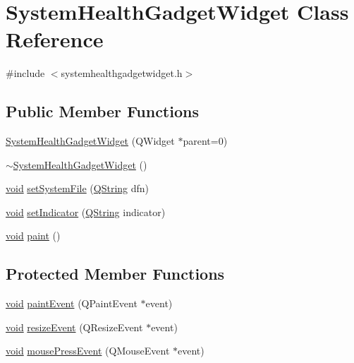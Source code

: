 \hypertarget{class_system_health_gadget_widget}{\section{\-System\-Health\-Gadget\-Widget \-Class \-Reference}
\label{class_system_health_gadget_widget}
}


{\ttfamily \#include $<$systemhealthgadgetwidget.\-h$>$}

\subsection*{\-Public \-Member \-Functions}
\begin{DoxyCompactItemize}
\item 
\hyperlink{group___system_health_plugin_ga8c9b20860af6995ec8b6970079e00477}{\-System\-Health\-Gadget\-Widget} (\-Q\-Widget $\ast$parent=0)
\item 
\hyperlink{group___system_health_plugin_gaafd1c69ed4569708eef2b628c1125ea8}{$\sim$\-System\-Health\-Gadget\-Widget} ()
\item 
\hyperlink{group___u_a_v_objects_plugin_ga444cf2ff3f0ecbe028adce838d373f5c}{void} \hyperlink{group___system_health_plugin_ga1caae283affc79dc1e9e0303d39d4158}{set\-System\-File} (\hyperlink{group___u_a_v_objects_plugin_gab9d252f49c333c94a72f97ce3105a32d}{\-Q\-String} dfn)
\item 
\hyperlink{group___u_a_v_objects_plugin_ga444cf2ff3f0ecbe028adce838d373f5c}{void} \hyperlink{group___system_health_plugin_gaf6ee345730445a2552355fcd54cb33cf}{set\-Indicator} (\hyperlink{group___u_a_v_objects_plugin_gab9d252f49c333c94a72f97ce3105a32d}{\-Q\-String} indicator)
\item 
\hyperlink{group___u_a_v_objects_plugin_ga444cf2ff3f0ecbe028adce838d373f5c}{void} \hyperlink{group___system_health_plugin_ga58a24548867f2bb40b36dfc3e0fc4b9e}{paint} ()
\end{DoxyCompactItemize}
\subsection*{\-Protected \-Member \-Functions}
\begin{DoxyCompactItemize}
\item 
\hyperlink{group___u_a_v_objects_plugin_ga444cf2ff3f0ecbe028adce838d373f5c}{void} \hyperlink{group___system_health_plugin_gaefb5569e2941f96ea452bb2e43575aed}{paint\-Event} (\-Q\-Paint\-Event $\ast$event)
\item 
\hyperlink{group___u_a_v_objects_plugin_ga444cf2ff3f0ecbe028adce838d373f5c}{void} \hyperlink{group___system_health_plugin_gacfa993929fde9cc3153dafa5a6509d65}{resize\-Event} (\-Q\-Resize\-Event $\ast$event)
\item 
\hyperlink{group___u_a_v_objects_plugin_ga444cf2ff3f0ecbe028adce838d373f5c}{void} \hyperlink{group___system_health_plugin_ga2558a85d789a3f51c15c92ac329b26d7}{mouse\-Press\-Event} (\-Q\-Mouse\-Event $\ast$event)
\end{DoxyCompactItemize}


